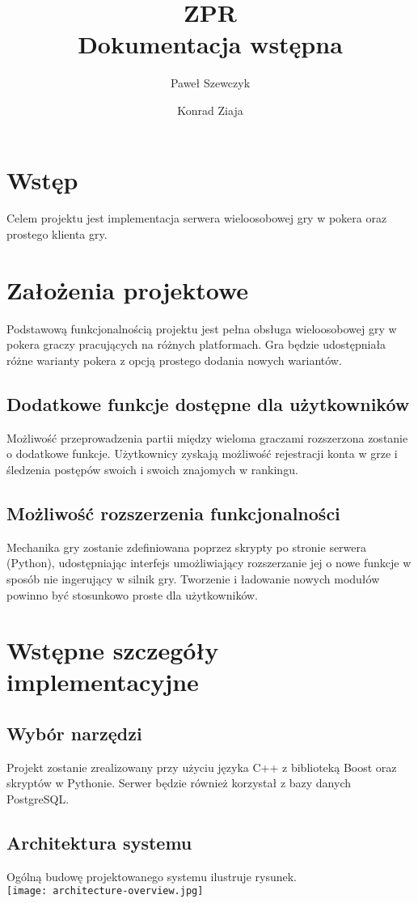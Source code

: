 \documentclass[12pt,a4paper]{article}
\title{ZPR\\
Dokumentacja wstępna }
\author{
Paweł Szewczyk
\and
Konrad Ziaja
}
\begin{document}
\maketitle

\section{Wstęp}
Celem projektu jest implementacja serwera wieloosobowej gry w pokera oraz prostego klienta gry.

\section{Założenia projektowe}
Podstawową funkcjonalnością projektu jest pełna obsługa wieloosobowej gry w pokera graczy pracujących na różnych platformach. Gra będzie udostępniała różne warianty 
pokera z opcją prostego dodania nowych wariantów.

\subsection{Dodatkowe funkcje dostępne dla użytkowników}
Możliwość przeprowadzenia partii między wieloma graczami rozszerzona zostanie o dodatkowe funkcje. Użytkownicy zyskają możliwość rejestracji konta w grze i śledzenia postępów swoich i swoich znajomych w rankingu.

\subsection{Możliwość rozszerzenia funkcjonalności}
Mechanika gry zostanie zdefiniowana poprzez skrypty po stronie serwera (Python), udostępniając interfejs umożliwiający rozszerzanie jej o nowe funkcje w sposób nie ingerujący w silnik gry. Tworzenie i ładowanie nowych modułów powinno być stosunkowo proste dla użytkowników.

\section{Wstępne szczegóły implementacyjne}
\subsection{Wybór narzędzi}
Projekt zostanie zrealizowany przy użyciu języka C++ z biblioteką Boost oraz skryptów w Pythonie. Serwer będzie również korzystał z bazy danych PostgreSQL.

\subsection{Architektura systemu}
Ogólną budowę projektowanego systemu ilustruje rysunek.\\
\texttt{[image: architecture-overview.jpg]}
\end{document}
